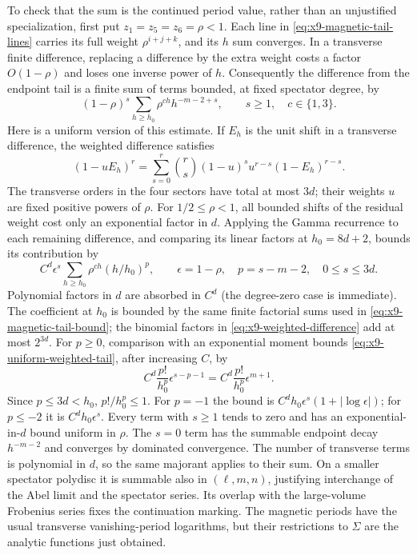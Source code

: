 To check that the sum is the continued period value, rather than
an unjustified specialization, first put $z_1=z_5=z_6=\rho<1$.
Each line in \eqref{eq:x9-magnetic-tail-lines} carries its full
weight $\rho^{i+j+k}$, and its $h$ sum converges. In a transverse
finite difference, replacing a difference by the extra weight
costs a factor $O(1-\rho)$ and loses one inverse power of $h$.
Consequently the difference from the endpoint tail is a finite
sum of terms bounded, at fixed spectator degree, by
\begin{equation}
 (1-\rho)^s\sum_{h\geq h_0}
      \rho^{ch}h^{-m-2+s},\qquad s\geq1,\quad c\in\{1,3\}.
 \label{eq:x9-magnetic-abel-bound}
\end{equation}
Here is a uniform version of this estimate. If $E_h$ is the unit
shift in a transverse difference, the weighted difference satisfies
\begin{equation}
 (1-uE_h)^r=\sum_{s=0}^r\binom rs(1-u)^s
                     u^{r-s}(1-E_h)^{r-s}.
 \label{eq:x9-weighted-difference}
\end{equation}
The transverse orders in the four sectors have total at most $3d$;
their weights $u$ are fixed positive powers of $\rho$. For
$1/2\leq\rho<1$, all bounded shifts of the residual weight cost
only an exponential factor in $d$. Applying the Gamma recurrence
to each remaining difference, and comparing its linear factors at
$h_0=8d+2$, bounds its contribution by
\begin{equation}
 C^d\epsilon^s\sum_{h\geq h_0}\rho^{ch}
       (h/h_0)^p,\qquad
 \epsilon=1-\rho,\quad p=s-m-2,\quad 0\leq s\leq3d.
 \label{eq:x9-uniform-weighted-tail}
\end{equation}
Polynomial factors in $d$ are absorbed in $C^d$ (the degree-zero
case is immediate). The coefficient at $h_0$ is bounded by the
same finite factorial sums used in \eqref{eq:x9-magnetic-tail-bound};
the binomial factors in \eqref{eq:x9-weighted-difference} add at
most $2^{3d}$.
For $p\geq0$, comparison with an exponential moment bounds
\eqref{eq:x9-uniform-weighted-tail}, after increasing $C$, by
\begin{equation}
 C^d\frac{p!}{h_0^p}\epsilon^{s-p-1}
 =C^d\frac{p!}{h_0^p}\epsilon^{m+1}.
\end{equation}
Since $p\leq3d<h_0$, $p!/h_0^p\leq1$. For $p=-1$ the
bound is $C^dh_0\epsilon^s(1+|\log\epsilon|)$; for $p\leq-2$
it is $C^dh_0\epsilon^s$. Every term with $s\geq1$ tends to
zero and has an exponential-in-$d$ bound uniform in $\rho$.
The $s=0$ term has the summable endpoint decay $h^{-m-2}$ and
converges by dominated convergence. The number of transverse
terms is polynomial in $d$, so the same majorant applies to their
sum. On a smaller spectator polydisc it is summable also in
$(\ell,m,n)$, justifying interchange of the Abel limit and the
spectator series. Its overlap with the large-volume Frobenius series fixes
the continuation marking. The magnetic periods have the usual
transverse vanishing-period logarithms, but their restrictions
to $\Sigma$ are the analytic functions just obtained.

